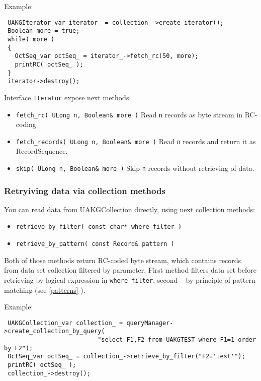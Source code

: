 Example:

\begin{verbatim}
 UAKGIterator_var iterator_ = collection_->create_iterator();
 Boolean more = true;
 while( more )
 { 
   OctSeq_var octSeq_ = iterator_->fetch_rc(50, more);
   printRC( octSeq_ );
 }
 iterator->destroy();
\end{verbatim}

 Interface \verb|Iterator| expose next methods:

 \begin{itemize}
   \item \verb|fetch_rc( ULong n, Boolean& more )|
     Read \verb|n| records as byte stream in RC-coding
   \item \verb|fetch_records( ULong n, Boolean& more )|
     Read \verb|n| records and return it as RecordSequence.
   \item \verb|skip( ULong n, Boolean& more )|
     Skip \verb|n| records without retrieving of data.
 \end{itemize}

\subsubsection{  Retryiving data via collection methods }

 You can read data from UAKGCollection
 directly, using next collection methods:

\begin{itemize}
 \item \verb|retrieve_by_filter( const char* where_filter )|
 \item \verb|retrieve_by_pattern( const Record& pattern )|
\end{itemize}

Both of those methods return RC-coded byte stream, which contains records
from data set collection filtered by parameter.
First method filters data set before retrieving by logical expression in \verb|where_filter|, second -- by principle of pattern matching (see \ref{patterns} ).

Example:

\begin{verbatim}
 UAKGCollection_var collection_ = queryManager->create_collection_by_query(
                          "select F1,F2 from UAKGTEST where F1=1 order by F2");
 OctSeq_var octSeq_ = collection_->retrieve_by_filter("F2='test'");
 printRC( octSeq_ );
 collection_->destroy();
\end{verbatim}

